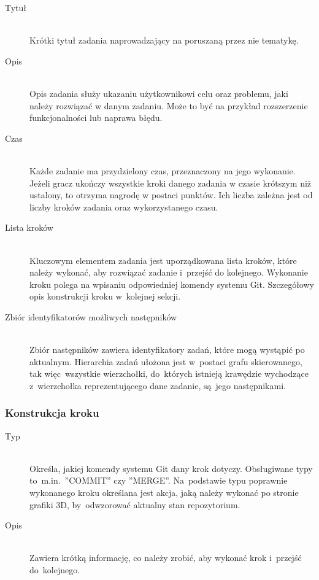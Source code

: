 \documentclass[12pt,a4paper,polish,thesis]{dcsbook}
\begin{document}
{\begin{description}
	\item[Tytuł] \hfill \\
		Krótki tytuł zadania naprowadzający na poruszaną przez nie tematykę.
	
	\item[Opis] \hfill \\
		Opis zadania służy ukazaniu użytkownikowi celu oraz problemu, jaki należy rozwiązać w danym zadaniu. Może to być na przykład rozszerzenie funkcjonalności lub naprawa błędu.
		
	\item[Czas] \hfill \\
		Każde zadanie ma przydzielony czas, przeznaczony na jego wykonanie. Jeżeli gracz ukończy wszystkie kroki danego zadania w czasie krótszym niż ustalony, to otrzyma nagrodę w postaci punktów. Ich liczba zależna jest od liczby kroków zadania oraz wykorzystanego czasu.	
	
	\item[Lista kroków] \hfill \\
		Kluczowym elementem zadania jest uporządkowana lista kroków, które należy wykonać, aby rozwiązać zadanie i~przejść do kolejnego. Wykonanie kroku polega na wpisaniu odpowiedniej komendy systemu Git. Szczegółowy opis konstrukcji kroku w~kolejnej sekcji.
		
	\item[Zbiór identyfikatorów możliwych następników] \hfill \\
		Zbiór następników zawiera identyfikatory zadań, które mogą wystąpić po aktualnym. Hierarchia zadań ułożona jest w~postaci grafu skierowanego, tak więc~wszystkie wierzchołki, do~których istnieją krawędzie wychodzące z~wierzchołka reprezentującego dane zadanie, są~jego następnikami.	
	\end{description}

	\subsubsection{Konstrukcja kroku}
	
	\begin{description}
		\item[Typ] \hfill \\
		Określa, jakiej komendy systemu Git dany krok dotyczy. Obsługiwane typy to~m.in.~''COMMIT'' czy ''MERGE''. Na~podstawie typu poprawnie wykonanego kroku określana jest akcja, jaką należy wykonać po stronie grafiki 3D, by~odwzorować aktualny stan repozytorium.
		
		\item[Opis] \hfill \\
		Zawiera krótką informację, co należy zrobić, aby wykonać krok i~przejść do~kolejnego. 
		

\end{description}}
\end{document}

